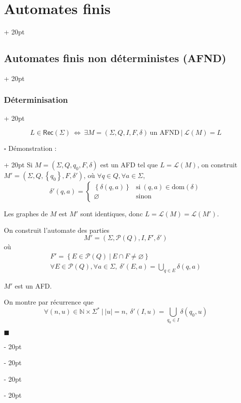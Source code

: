 \documentclass[a4paper, 12pt, twoside]{article}
\newcommand{\N}{\mathbb{N}} %
\newcommand{\lr}[1]{\left( #1 \right)}
\newcommand{\set}[1]{\left\{ #1 \right\}}
\newcommand{\abs}[1]{\left\lvert #1 \right\rvert}
\newcommand{\ssi}{\ \Leftrightarrow \ }
\newcommand{\ind}[1][20pt]{\advance\leftskip + #1}
\newcommand{\deind}[1][20pt]{\advance\leftskip - #1}
\newenvironment{indt}[2][20pt]{#2 \par \ind[#1]}{\par \deind} %
\newenvironment{proof}[1][{Démonstration :}]{\begin{indt}{$\square$ #1}}{$\blacksquare$ \end{indt}}
\newcommand{\Rec}[1]{\mathsf{Rec}\!\lr{#1}}
\begin{document}
\begin{indt}{\section{Automates finis}}
\begin{indt}{\subsection{Automates finis non déterministes (AFND)}}
\begin{indt}{\subsubsection{Déterminisation}}
\begin{emphBox}
                    \[
                        L \in \Rec \Sigma \ssi
                        \exists M = (\Sigma, Q, I, F, \delta)\ \text{un AFND}\ |\ \mathcal L(M) = L
                    \]
                \end{emphBox}

                \vspace{12pt}
                
                \begin{proof}
                    \boxed{\Rightarrow} Si $M = (\Sigma, Q, q_0, F, \delta)$ est un AFD tel que $L = \mathcal L(M)$, on construit $M' = (\Sigma, Q, \set{q_0}, F, \delta')$, où $\forall q \in Q, \forall a \in \Sigma$,
                    \[
                        \delta'(q, a) =
                        \begin{cases}
                            \set{\delta(q, a)}
                            & \text{si}\ (q, a) \in \mathrm{dom}(\delta)
                            \\
                            \varnothing
                            & \text{sinon}
                        \end{cases}
                    \]

                    Les graphes de $M$ est $M'$ sont identiques, donc $L = \mathcal L(M) = \mathcal L(M')$.

                    \vspace{12pt}
                    
                    \boxed{\Leftarrow} On construit l'automate des parties
                    \[
                        M' = (\Sigma, \mathcal P(Q), I, F', \delta')
                    \]
                    où
                    \[
                        \begin{array}{l}
                            F' = \set{E \in \mathcal P(Q) \ |\ E \cap F \neq \varnothing}
                            \\
                            \forall E \in \mathcal P(Q), \forall a \in \Sigma,\
                            \delta'(E, a) = \displaystyle \bigcup_{q \in E} \delta(q, a)
                        \end{array}
                    \]

                    $M'$ est un AFD.

                    On montre par récurrence que
                    \[
                        \forall (n, u) \in \N \times \Sigma^*\ |\ \abs u = n,\
                        \delta'(I, u) = \bigcup_{q_0 \in I} \delta(q_0, u)
                    \]


\end{proof}
\end{indt}
\end{indt}
\end{indt}
\end{document}
